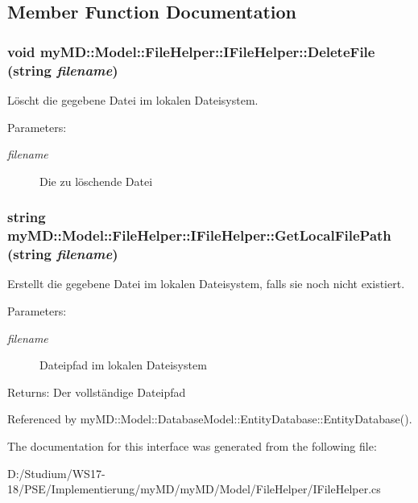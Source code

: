 \subsection{Member Function Documentation}
\hypertarget{interfacemy_m_d_1_1_model_1_1_file_helper_1_1_i_file_helper_ff873363eee7227752f2450cb176f009}{
\subsubsection[DeleteFile]{\setlength{\rightskip}{0pt plus 5cm}void my\-MD::Model::File\-Helper::IFile\-Helper::Delete\-File (string {\em filename})}}
\label{df/df8/interfacemy_m_d_1_1_model_1_1_file_helper_1_1_i_file_helper_ff873363eee7227752f2450cb176f009}


L\"{o}scht die gegebene Datei im lokalen Dateisystem. 

\begin{Desc}
\item[Parameters:]
\begin{description}
\item[{\em filename}]Die zu l\"{o}schende Datei\end{description}
\end{Desc}
\hypertarget{interfacemy_m_d_1_1_model_1_1_file_helper_1_1_i_file_helper_aa22e4a15c7b3284942b2a4ad797369c}{
\subsubsection[GetLocalFilePath]{\setlength{\rightskip}{0pt plus 5cm}string my\-MD::Model::File\-Helper::IFile\-Helper::Get\-Local\-File\-Path (string {\em filename})}}
\label{df/df8/interfacemy_m_d_1_1_model_1_1_file_helper_1_1_i_file_helper_aa22e4a15c7b3284942b2a4ad797369c}


Erstellt die gegebene Datei im lokalen Dateisystem, falls sie noch nicht existiert. 

\begin{Desc}
\item[Parameters:]
\begin{description}
\item[{\em filename}]Dateipfad im lokalen Dateisystem\end{description}
\end{Desc}
\begin{Desc}
\item[Returns:]Der vollst\"{a}ndige Dateipfad\end{Desc}


Referenced by my\-MD::Model::Database\-Model::Entity\-Database::Entity\-Database().

The documentation for this interface was generated from the following file:\begin{CompactItemize}
\item 
D:/Studium/WS17-18/PSE/Implementierung/my\-MD/my\-MD/Model/File\-Helper/IFile\-Helper.cs\end{CompactItemize}
